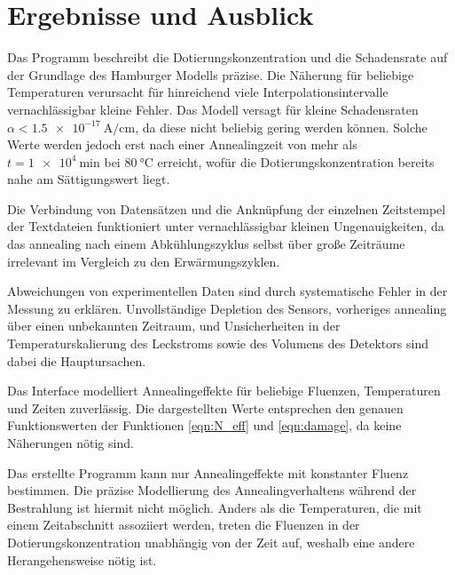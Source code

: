\chapter{Ergebnisse und Ausblick}
Das Programm beschreibt die Dotierungskonzentration und die Schadensrate
auf der Grundlage des Hamburger Modells präzise. Die Näherung für beliebige
Temperaturen verursacht für hinreichend viele Interpolationsintervalle
vernachlässigbar kleine Fehler. Das Modell versagt für kleine Schadensraten $\alpha < \SI{1.5e-17}{\ampere\per\centi\meter}$,
da diese nicht beliebig gering werden können. Solche Werte werden jedoch erst nach
einer Annealingzeit von mehr als $t=\SI{1e4}{\minute}$ bei $\SI{80}{\celsius}$ erreicht, wofür
die Dotierungskonzentration bereits nahe am Sättigungswert liegt.

Die Verbindung von Datensätzen und die Anknüpfung der einzelnen Zeitstempel der
Textdateien funktioniert unter vernachlässigbar kleinen Ungenauigkeiten, da das annealing
nach einem Abkühlungszyklus selbst über große Zeiträume irrelevant im Vergleich zu
den Erwärmungszyklen.

Abweichungen von experimentellen Daten sind durch systematische Fehler in der Messung
zu erklären. Unvollständige Depletion des Sensors, vorheriges annealing über einen
unbekannten Zeitraum, und Unsicherheiten in der Temperaturskalierung des Leckstroms sowie
des Volumens des Detektors sind dabei die Hauptursachen.

Das Interface modelliert Annealingeffekte für beliebige Fluenzen, Temperaturen und
Zeiten zuverlässig. Die dargestellten Werte entsprechen den genauen Funktionswerten
der Funktionen \ref{eqn:N_eff} und \ref{eqn:damage}, da keine Näherungen nötig sind.


Das erstellte Programm kann nur Annealingeffekte mit konstanter Fluenz
bestimmen. Die präzise Modellierung des Annealingverhaltens während der Bestrahlung
ist hiermit nicht möglich. Anders als die Temperaturen, die mit einem Zeitabschnitt
assoziiert werden, treten die Fluenzen in der Dotierungskonzentration
unabhängig von der Zeit auf, weshalb eine andere Herangehensweise nötig ist.
